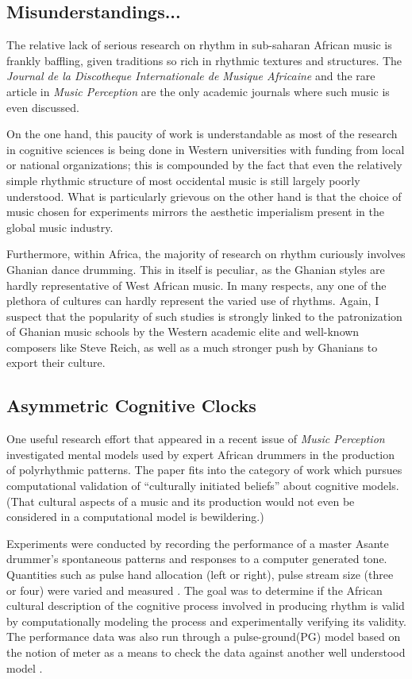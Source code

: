 \subsection{Misunderstandings...}

The relative lack of serious research on rhythm in sub-saharan 
African music is frankly baffling, given traditions so rich in 
rhythmic textures and structures. The {\sl Journal de la Discotheque 
Internationale de Musique Africaine} and the rare article in {\sl
Music Perception} are the only academic journals where such music 
is even discussed. 

On the one hand, this paucity of work is understandable as most of the 
research in cognitive sciences is being done in Western universities 
with funding from local or national organizations; this is compounded 
by the fact that even the relatively simple rhythmic structure of 
most occidental music is still largely poorly understood.  What is
particularly grievous on the other hand is that the choice of music
chosen for experiments mirrors the aesthetic imperialism present in 
the global music industry. 

Furthermore, within Africa, the majority of research on rhythm
curiously involves Ghanian dance drumming. This in itself is peculiar,
as the Ghanian styles are hardly representative of West 
African music. In many respects, any one of the plethora of cultures 
can hardly represent the varied use of rhythms. Again, I suspect that 
the popularity of such studies is strongly linked to the patronization
of Ghanian music schools by the Western academic elite and well-known
composers like Steve Reich, as well as a much stronger push by
Ghanians to export their culture.

\vspace{5mm}
\subsection{Asymmetric Cognitive Clocks}

One useful research effort that appeared in a recent issue of 
{\sl Music Perception} investigated mental models used by expert 
African drummers in the production of polyrhythmic patterns. The 
paper fits into the category of work which pursues computational 
validation of ``culturally initiated beliefs'' about cognitive 
models. (That cultural aspects of a music and its production would 
not even be considered in a computational model is bewildering.)

Experiments were conducted by recording the performance of 
a master Asante drummer's spontaneous patterns and responses to a
computer generated tone. Quantities such as pulse hand allocation
(left or right), pulse stream size (three or four) were varied and 
measured \cite[p. 191]{Magill:97}.  The goal was to determine if the 
African cultural description of the cognitive process involved in 
producing rhythm is valid by computationally modeling the process 
and experimentally verifying its validity. The performance data was also
run through a pulse-ground(PG) model based on the notion of meter as a 
means to check the data against another well understood model \cite[p. 191]{Magill:97}.

